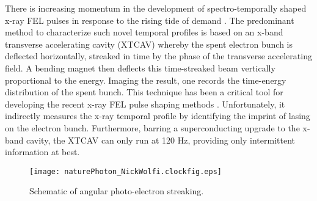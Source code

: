 







There is increasing momentum in the development of spectro-temporally shaped x-ray FEL pulses \cite{eehg2009,Lutman13_twocolor,Marinelli13_twocolor,Allaria2014,Marinelli2015,Hemsing2016,Prince2016,Lutman2016,LutmanFreshSlice2016,Marinelli2016} in response to the rising tide of demand \cite{Cederbaum2008,Mukamel2007,Biggs2012,Mukamel2013,4WaveMixing,TIGER2015,ArtemFOA}.
The predominant method to characterize such novel temporal profiles is based on an x-band transverse accelerating cavity (XTCAV) \cite{xtcav2014} whereby the spent electron bunch is deflected horizontally, streaked in time by the phase of the transverse accelerating field.
A bending magnet then deflects this time-streaked beam vertically proportional to the energy.
Imaging the result, one records the time-energy distribution of the spent bunch.
This technique has been a critical tool for developing the recent x-ray FEL pulse shaping methods \cite{Marinelli2015,Marinelli2016,LutmanFreshSlice2016,Lutman2016}.
Unfortunately, it indirectly measures the x-ray temporal profile by identifying the imprint of lasing on the electron bunch.
Furthermore, barring a superconducting upgrade to the x-band cavity, the XTCAV can only run at 120 Hz, providing only intermittent information at best.

\begin{wrapfigure}[10]{r}{.65\linewidth}
\vspace{-\baselineskip}
\centerline{
	\texttt{[image: naturePhoton\_NickWolfi.clockfig.eps]}
}
\vspace{-\baselineskip}
\caption{
	\label{streakingschematic} 
	Schematic of angular photo-electron streaking. \cite{Nick2018}
}
\end{wrapfigure}

